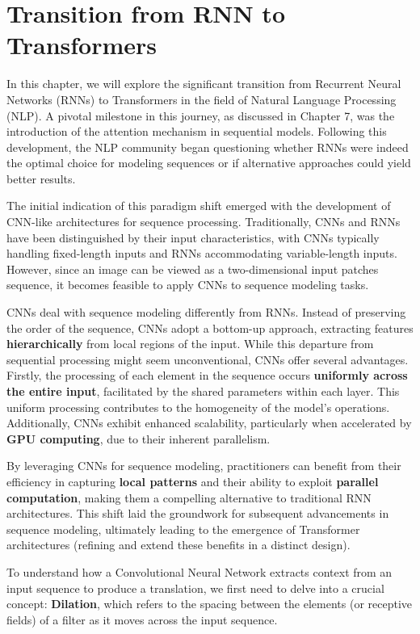 \section{Transition from RNN to Transformers } 
In this chapter, we will explore the significant transition from Recurrent Neural Networks (RNNs) to Transformers in the field of Natural Language Processing (NLP). A pivotal milestone in this journey, as discussed in Chapter 7, was the introduction of the attention mechanism in sequential models. Following this development, the NLP community began questioning whether RNNs were indeed the optimal choice for modeling sequences or if alternative approaches could yield better results.

The initial indication of this paradigm shift emerged with the development of CNN-like architectures for sequence processing. Traditionally, CNNs and RNNs have been distinguished by their input characteristics, with CNNs typically handling fixed-length inputs and RNNs accommodating variable-length inputs. However, since an image can be viewed as a two-dimensional input patches sequence, it becomes feasible to apply CNNs to sequence modeling tasks.

CNNs deal with sequence modeling differently from RNNs. Instead of preserving the order of the sequence, CNNs adopt a bottom-up approach, extracting features \textbf{hierarchically} from local regions of the input. While this departure from sequential processing might seem unconventional, CNNs offer several advantages. Firstly, the processing of each element in the sequence occurs \textbf{uniformly across the entire input}, facilitated by the shared parameters within each layer. This uniform processing contributes to the homogeneity of the model's operations. Additionally, CNNs exhibit enhanced scalability, particularly when accelerated by \textbf{GPU computing}, due to their inherent parallelism.

By leveraging CNNs for sequence modeling, practitioners can benefit from their efficiency in capturing \textbf{local patterns} and their ability to exploit \textbf{parallel computation}, making them a compelling alternative to traditional RNN architectures. This shift laid the groundwork for subsequent advancements in sequence modeling, ultimately leading to the emergence of Transformer architectures (refining and extend these benefits in a distinct design).

To understand how a Convolutional Neural Network extracts context from an input sequence to produce a translation, we first need to delve into a crucial concept: \textbf{Dilation}, which refers to the spacing between the elements (or receptive fields) of a filter as it moves across the input sequence. 

